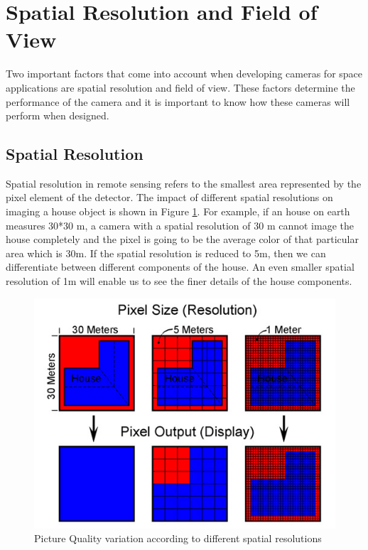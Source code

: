 \section{Spatial Resolution and Field of View}
Two important factors that come into account when developing cameras for space applications are spatial resolution and field of view. These factors determine the performance of the camera and it is important to know how these cameras will perform when designed.


\subsection{Spatial Resolution}
Spatial resolution in remote sensing refers to the smallest area represented by the pixel element of the detector. The impact of different spatial resolutions on imaging a house object is shown in Figure \ref{fig:spatial_resolution}. For example, if an house on earth measures 30*30 m, a camera with a spatial resolution of 30 m cannot image the house completely and the pixel is going to be the average color of that particular area which is 30m. If the spatial resolution is reduced to 5m, then we can differentiate between different components of the house. An even smaller spatial resolution of 1m will enable us to see the finer details of the house components. 

\begin{figure}[htb]
\includegraphics[width=\textwidth]{pics/spatial-resolution}
\caption{Picture Quality variation according to different spatial resolutions\cite{SpatialResol}}
\label{fig:spatial_resolution}
\end{figure}

